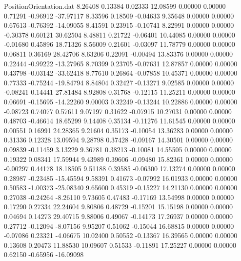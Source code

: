 \begin{filecontents}{PositionOrientation.dat}
   8.26408    0.13384    0.02333    12.08599    0.00000    0.00000    0.71291   -0.96912  -37.97117
   8.33596    0.18509   -0.04633     9.35648    0.00000    0.00000    0.67613   -0.76392  -14.09055
   8.41591    0.23915   -0.10741     8.22991    0.00000    0.00000   -0.30378    0.60121   30.62504
   8.48811    0.21722   -0.06401    10.44085    0.00000    0.00000   -0.01680    0.45896   18.71326
   8.56009    0.21601   -0.03097    11.78779    0.00000    0.00000    0.06811    0.36169   28.42706
   8.63206    0.22091   -0.00494    13.83376    0.00000    0.00000    0.22444   -0.99222  -13.27965
   8.70399    0.23705   -0.07631    12.87857    0.00000    0.00000    0.43798   -0.03142  -33.62418
   8.77610    0.26864   -0.07858    10.45371    0.00000    0.00000    0.77333   -0.75244  -19.84794
   8.84804    0.32427   -0.13271     9.02585    0.00000    0.00000   -0.08241    0.14441   27.81484
   8.92808    0.31768   -0.12115    11.25211    0.00000    0.00000    0.06691   -0.15695  -14.22260
   9.00003    0.32249   -0.13244    10.22886    0.00000    0.00000   -0.08723    0.74077    0.57611
   9.07197    0.31622   -0.07915    10.27031    0.00000    0.00000    0.48703   -0.46614   18.65299
   9.14408    0.35134   -0.11276    11.61545    0.00000    0.00000    0.00551    0.16991   24.28365
   9.21604    0.35173   -0.10054    13.36283    0.00000    0.00000    0.31336    0.12328   13.09594
   9.28798    0.37428   -0.09167    14.30501    0.00000    0.00000    0.09839   -0.11459    3.13229
   9.36781    0.38213   -0.10081    14.55505    0.00000    0.00000    0.19322    0.08341   17.59944
   9.43989    0.39606   -0.09480    15.82361    0.00000    0.00000   -0.00297    0.44178   18.18505
   9.51188    0.39585   -0.06300    17.13274    0.00000    0.00000    0.28987   -0.23485  -15.45594
   9.58391    0.41673   -0.07992    16.01933    0.00000    0.00000    0.50583   -1.00373  -25.08340
   9.65600    0.45319   -0.15227    14.21130    0.00000    0.00000    0.27038   -0.24264   -8.26110
   9.73605    0.47483   -0.17169    13.54998    0.00000    0.00000    0.17290    0.27334   22.24604
   9.80806    0.48729   -0.15201    15.15198    0.00000    0.00000    0.04694    0.14273   29.40715
   9.88006    0.49067   -0.14173    17.26937    0.00000    0.00000    0.27712   -0.12094   -8.07156
   9.95207    0.51062   -0.15044    16.68815    0.00000    0.00000   -0.07086    0.23321   -4.06675
  10.02400    0.50552   -0.13367    16.39565    0.00000    0.00000    0.13608    0.20473   11.88530
  10.09607    0.51533   -0.11891    17.25227    0.00000    0.00000    0.62150   -0.65956  -16.09098

\end{filecontents}
